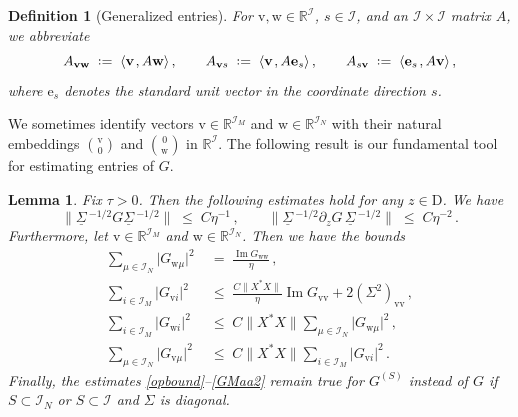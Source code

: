 \documentclass[11pt]{article} %
\numberwithin{equation}{section}
\numberwithin{figure}{section}
\theoremstyle{plain} %
\newtheorem{lemma}[theorem]{Lemma}
\newtheorem{definition}[theorem]{Definition}
\theoremstyle{definition} %
\newcommand{\f}[1]{\boldsymbol{\mathrm{#1}}} %
\renewcommand{\cal}{\mathcal}
\newcommand{\ul}[1]{\underline{#1} \!\,} %
\newcommand{\R}{\mathbb{R}}
\newcommand*{\deq}{\mathrel{\vcenter{\baselineskip0.65ex \lineskiplimit0pt \hbox{.}\hbox{.}}}=}
\renewcommand{\leq}{\leqslant}
\newcommand{\abs}[1]{\lvert #1 \rvert}
\newcommand{\norm}[1]{\lVert #1 \rVert}
\newcommand{\normb}[1]{\bigl\lVert #1 \bigr\rVert}
\newcommand{\scalar}[2]{\langle{#1} \mspace{2mu}, {#2}\rangle}
\DeclareMathOperator{\im}{Im}
\newcommand{\be}{\begin{equation}}
\newcommand{\ee}{\end{equation}}
\begin{document}
\begin{definition}[Generalized entries]
For $\f v, \f w \in \R^{\cal I}$, $s \in \cal I$, and an $\cal I \times \cal I$ matrix $A$, we abbreviate
\begin{equation*}
A_{\f v \f w} \;\deq\; \scalar{\f v}{A \f w} \,, \qquad 
A_{\f v s} \;\deq\; \scalar{\f v}{A \f e_s}\,, \qquad
A_{s \f v} \;\deq\; \scalar{\f e_s}{A \f v}\,,
\end{equation*}
where $\f e_s$ denotes the standard unit vector in the coordinate direction $s$.
\end{definition}

We sometimes identify vectors $\f v \in \R^{\cal I_M}$ and $\f w \in \R^{\cal I_N}$ with their natural embeddings $\binom{\f v}{0}$ and $\binom{0}{\f w}$ in $\R^{\cal I}$.
The following result is our fundamental tool for estimating entries of $G$.





\begin{lemma}\label{lemma: basic}
Fix $\tau > 0$. Then the following estimates hold for any $z \in \f D$.
We have
\be\label{opbound}
\normb{\ul \Sigma^{-1/2} G \ul \Sigma^{-1/2}} \;\leq\; C \eta^{-1}\,, \qquad  \normb{\ul \Sigma^{-1/2} \partial_z G \, \ul \Sigma^{-1/2}} \;\leq\; C \eta^{-2}\,.
\ee
Furthermore, let $\f v \in \R^{\cal I_M}$ and $\f w \in \R^{\cal I_N}$.
Then we have the bounds
\begin{align}
\label{GMaa4}
\sum_{\mu \in \cal I_N} \abs{G_{\f w \mu}}^2 &\;=\; \frac{\im G_{\f w \f w}}{\eta}\,,
\\
\label{GMaa}
\sum_{i \in \cal I_M} \abs{G_{\f v i}}^2 &\;\leq\;  \frac{C \norm{X^* X}}{\eta} \im G_{\f v \f v} + 2 (\Sigma^2)_{\f v \f v}\,,
\\
\label{GMaa3}
\sum_{i \in \cal I_M} \abs{G_{\f w i}}^2
&\;\leq\; C \norm{X^* X} \sum_{\mu \in \cal I_N} \abs{G_{\f w \mu}}^2\,,
\\
\label{GMaa2}
\sum_{\mu \in \cal I_N} \abs{G_{\f v \mu}}^2 &\;\leq\;  C \norm{X^* X} \sum_{i \in \cal I_M} \abs{G_{\f v i}}^2\,.
\end{align}
Finally, the estimates \eqref{opbound}--\eqref{GMaa2} remain true for $G^{(S)}$ instead of $G$ if $S \subset \cal I_N$ or $S \subset \cal I$ and $\Sigma$ is diagonal.
\end{lemma}
\end{document}
